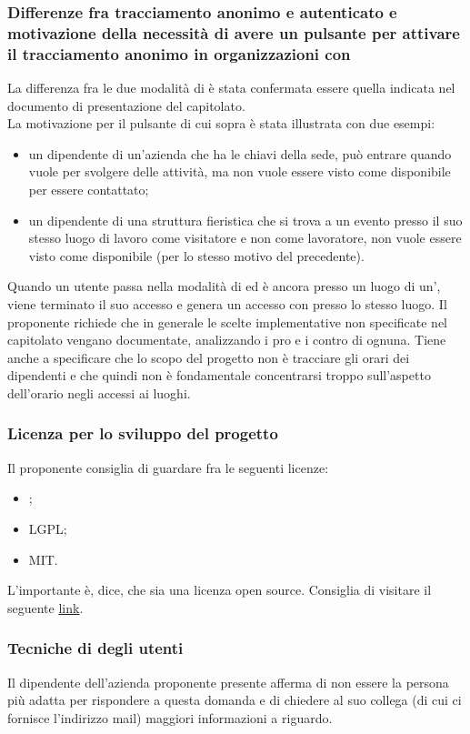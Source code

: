 \subsubsection*{Differenze fra tracciamento anonimo e autenticato e motivazione della necessità di avere un pulsante per attivare il tracciamento anonimo in organizzazioni con }
La differenza fra le due modalità di  è stata confermata essere quella indicata nel documento di presentazione del capitolato.\\
La motivazione per il pulsante di cui sopra è stata illustrata con due esempi:
\begin{itemize}
	\item un dipendente di un'azienda che ha le chiavi della sede, può entrare quando vuole per svolgere delle attività, ma non vuole essere visto come disponibile per essere contattato;
	\item un dipendente di una struttura fieristica che si trova a un evento presso il suo stesso luogo di lavoro come visitatore e non come lavoratore, non vuole essere visto come disponibile (per lo stesso motivo del precedente).
\end{itemize}
Quando un utente passa nella modalità di  ed è ancora presso un luogo di un', viene terminato il suo accesso e genera un accesso con  presso lo stesso luogo.
Il proponente richiede che in generale le scelte implementative non specificate nel capitolato vengano documentate, analizzando i pro e i contro di ognuna. Tiene anche a specificare che lo scopo del progetto non è
tracciare gli orari dei dipendenti e che quindi non è fondamentale concentrarsi troppo sull'aspetto dell'orario negli accessi ai luoghi.

\subsubsection*{Licenza per lo sviluppo del progetto}
Il proponente consiglia di guardare fra le seguenti licenze:
\begin{itemize}
	\item {};
	\item LGPL;
	\item MIT.
\end{itemize}
L'importante è, dice, che sia una licenza open source. Consiglia di visitare il seguente \href{https://opensource.org/licenses}{link}.

\subsubsection*{Tecniche di  degli utenti}
Il dipendente dell'azienda proponente presente afferma di non essere la persona più adatta per rispondere a questa domanda e di chiedere al suo collega (di cui ci fornisce l'indirizzo mail) maggiori informazioni a riguardo.

